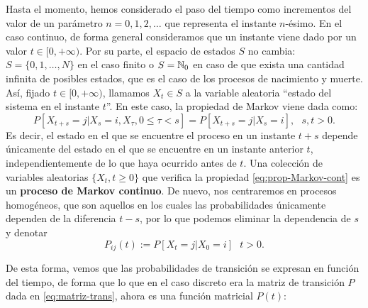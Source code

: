     Hasta el momento, hemos considerado el paso del tiempo como incrementos del valor de un parámetro $n=0,1,2,\dots$ que representa el instante $n$-ésimo. En el caso continuo, de forma general consideramos que un instante viene dado por un valor $t\in[0,+\infty)$. Por su parte, el espacio de estados $S$ no cambia: $S=\{0,1,\dots,N\}$ en el caso finito o $S=\mathbb{N}_0$ en caso de que exista una cantidad infinita de posibles estados, que es el caso de los procesos de nacimiento y muerte. Así, fijado $t\in[0,+\infty)$, llamamos $X_t\in S$ a la variable aleatoria ``estado del sistema en el instante $t$''. En este caso, la propiedad de Markov viene dada como:
    \begin{equation}
        \label{eq:prop-Markov-cont}
        P[X_{t+s}=j|X_s=i, X_\tau, 0\leq \tau < s] = P[X_{t+s}=j|X_s=i], \ \ \ s,t>0.
    \end{equation}
    Es decir, el estado en el que se encuentre el proceso en un instante $t+s$ depende únicamente del estado en el que se encuentre en un instante anterior $t$, independientemente de lo que haya ocurrido antes de $t$.  Una colección de variables aleatorias $\{X_t, t\geq 0\}$ que verifica la propiedad \eqref{eq:prop-Markov-cont} es un \textbf{proceso de Markov continuo}. De nuevo, nos centraremos en procesos homogéneos, que son aquellos en los cuales las probabilidades únicamente dependen de la diferencia $t-s$, por lo que podemos eliminar la dependencia de $s$ y denotar
    \begin{equation}
        \label{eq:prob-trans-cont}
       P_{ij}(t) := P[X_{t}=j|X_0=i]  \ \ \ t>0.
    \end{equation}
    
    De esta forma, vemos que las probabilidades de transición se expresan en función del tiempo, de forma que lo que en el caso discreto era la matriz de transición $P$ dada en \eqref{eq:matriz-trans}, ahora es una función matricial $P(t)$:

